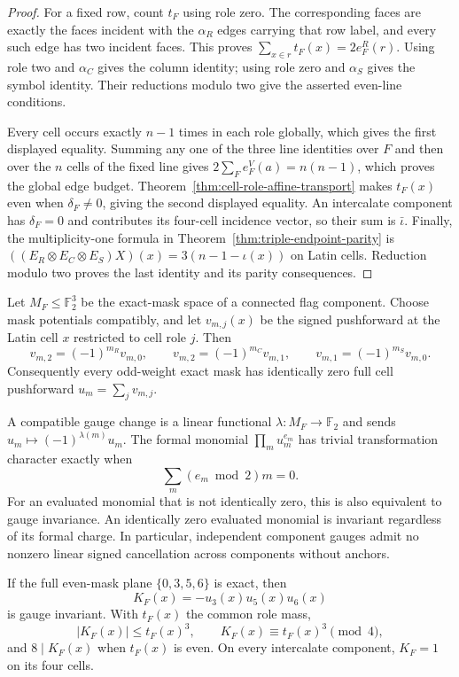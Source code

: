 \begin{proof}
For a fixed row, count $t_F$ using role zero.  The corresponding faces are
exactly the faces incident with the $\alpha_R$ edges carrying that row label,
and every such edge has two incident faces.  This proves
$\sum_{x\in r}t_F(x)=2e^R_F(r)$.  Using role two and $\alpha_C$ gives the
column identity; using role zero and $\alpha_S$ gives the symbol identity.
Their reductions modulo two give the asserted even-line conditions.

Every cell occurs exactly $n-1$ times in each role globally, which gives the
first displayed equality.  Summing any one of the three line identities over
$F$ and then over the $n$ cells of the fixed line gives
$2\sum_F e^V_F(a)=n(n-1)$, which proves the global edge budget.
Theorem~\ref{thm:cell-role-affine-transport} makes $t_F(x)$ even when
$\delta_F\ne0$, giving the second displayed equality.  An intercalate
component has $\delta_F=0$ and contributes its four-cell incidence vector,
so their sum is $\bar\iota$.  Finally, the multiplicity-one formula in
Theorem~\ref{thm:triple-endpoint-parity} is
$((E_R\otimes E_C\otimes E_S)X)(x)=3(n-1-\iota(x))$ on Latin cells.  Reduction
modulo two proves the last identity and its parity consequences.
\end{proof}

\begin{theorem}
\label{thm:gauge-invariant-cell-lift}
Let $M_F\leq\mathbb F_2^3$ be the exact-mask space of a connected flag
component.  Choose mask potentials compatibly, and let $v_{m,j}(x)$ be the
signed pushforward at the Latin cell $x$ restricted to cell role $j$.  Then
\[
 v_{m,2}=(-1)^{m_R}v_{m,0},\qquad
 v_{m,2}=(-1)^{m_C}v_{m,1},\qquad
 v_{m,1}=(-1)^{m_S}v_{m,0}.
\]
Consequently every odd-weight exact mask has identically zero full cell
pushforward $u_m=\sum_jv_{m,j}$.

A compatible gauge change is a linear functional
$\lambda:M_F\to\mathbb F_2$ and sends
$u_m\mapsto(-1)^{\lambda(m)}u_m$.  The formal monomial
$\prod_m u_m^{e_m}$ has trivial transformation character exactly when
\[
 \sum_m(e_m\bmod2)m=0.
\]
For an evaluated monomial that is not identically zero, this is also
equivalent to gauge invariance.  An identically zero evaluated monomial is
invariant regardless of its formal charge.
In particular, independent component gauges admit no nonzero linear signed
cancellation across components without anchors.

If the full even-mask plane $\{0,3,5,6\}$ is exact, then
\[
 K_F(x)=-u_3(x)u_5(x)u_6(x)
\]
is gauge invariant.  With $t_F(x)$ the common role mass,
\[
 |K_F(x)|\leq t_F(x)^3,\qquad
 K_F(x)\equiv t_F(x)^3\pmod4,
\]
and $8\mid K_F(x)$ when $t_F(x)$ is even.  On every intercalate component,
$K_F=1$ on its four cells.
\end{theorem}

